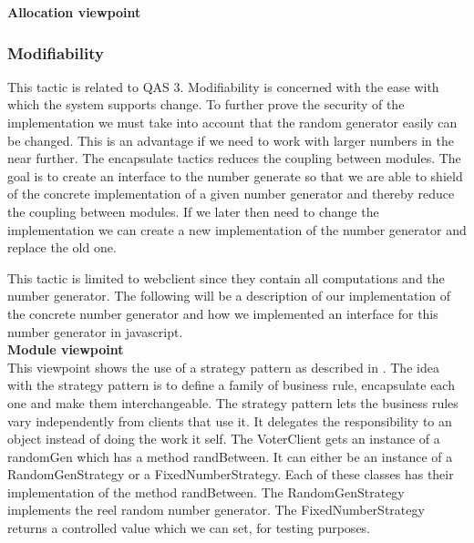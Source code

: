 \noindent
\textbf{Allocation viewpoint}\\


\noindent
\subsubsection{Modifiability}
This tactic is related to QAS 3. Modifiability is concerned with the ease with which the system supports change. To further prove the security of the implementation we must take into account that the random generator easily can be changed. This is an advantage if we need to work with larger numbers in the near further. The encapsulate tactics reduces the coupling between modules. The goal is to create an interface to the number generate so that we are able to shield of the concrete implementation of a given number generator and thereby reduce the coupling between modules. If  we later then need to change the implementation we can create a new implementation of the number generator and  replace the old one. 


\begin{center}
\end{center}

\noindent
This tactic is limited to webclient since they contain all computations and the number generator. The following will be a description of our implementation of the concrete number generator and how we implemented an interface for this number generator in javascript.\\


\noindent
\textbf{Module viewpoint}\\
This viewpoint shows the use of a strategy pattern as described in \cite{Baerbak10}. The idea with the strategy pattern is to define a family of business rule, encapsulate each one and make them interchangeable. The strategy pattern lets the business rules vary independently from clients that use it. It delegates the responsibility to an object instead of doing the work it self. The VoterClient gets an instance of a randomGen which has a method randBetween. It can either be an instance of a RandomGenStrategy or a FixedNumberStrategy. Each of these classes has their implementation of the method randBetween. The RandomGenStrategy implements the reel random number generator. The FixedNumberStrategy returns a controlled value which we can set, for testing purposes.\\
\begin{center}
\end{center}






